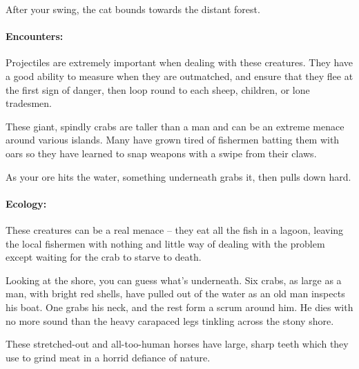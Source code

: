 \begin{multicols}{2}
\begin{boxtext}
	After your swing, the cat bounds towards the distant forest.

\end{boxtext}

\paragraph{Encounters:} Projectiles are extremely important when dealing with these creatures.
They have a good ability to measure when they are outmatched, and ensure that they flee at the first sign of danger, then loop round to each sheep, children, or lone tradesmen.

\nuracat

\label{nura_crab}

These giant, spindly crabs are taller than a man and can be an extreme menace around various islands.
Many have grown tired of fishermen batting them with oars so they have learned to snap weapons with a swipe from their claws.

\begin{boxtext}

	As your ore hits the water, something underneath grabs it, then pulls down hard.

\end{boxtext}

\paragraph{Ecology:} These creatures can be a real menace -- they eat all the fish in a lagoon, leaving the local fishermen with nothing and little way of dealing with the problem except waiting for the crab to starve to death.

\begin{boxtext}

	Looking at the shore, you can guess what's underneath.
	Six crabs, as large as a man, with bright red shells, have pulled out of the water as an old man inspects his boat.
	One grabs his neck, and the rest form a scrum around him.
	He dies with no more sound than the heavy carapaced legs tinkling across the stony shore.

\end{boxtext}


\label{nura_horse}
\nurahorse

These stretched-out and all-too-human horses have large, sharp teeth which they use to grind meat in a horrid defiance of nature.


\end{multicols}
